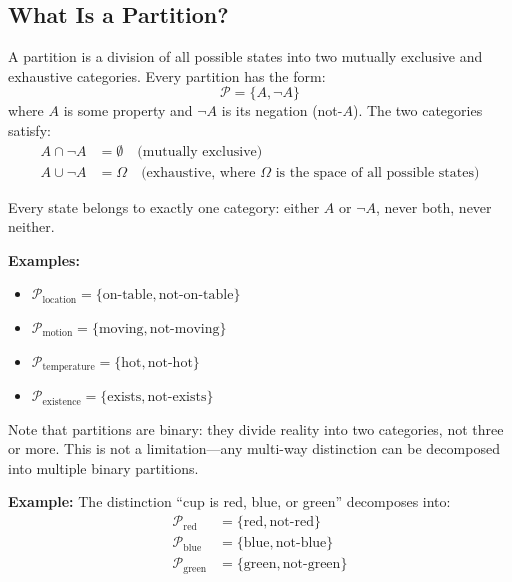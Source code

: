 \documentclass[twocolumn,10pt]{article}
\theoremstyle{definition}
\theoremstyle{remark}
\begin{document}
\subsection{What Is a Partition?}

A partition is a division of all possible states into two mutually exclusive and exhaustive categories. Every partition has the form:
\begin{equation}
\mathcal{P} = \{A, \neg A\}
\end{equation}
where $A$ is some property and $\neg A$ is its negation (not-$A$). The two categories satisfy:
\begin{align}
A \cap \neg A &= \emptyset \quad \text{(mutually exclusive)} \\
A \cup \neg A &= \Omega \quad \text{(exhaustive, where $\Omega$ is the space of all possible states)}
\end{align}

\noindent Every state belongs to exactly one category: either $A$ or $\neg A$, never both, never neither.

\vspace{0.2cm}
\noindent\textbf{Examples:}

\begin{itemize}
\item $\mathcal{P}_{\text{location}} = \{\text{on-table}, \text{not-on-table}\}$
\item $\mathcal{P}_{\text{motion}} = \{\text{moving}, \text{not-moving}\}$
\item $\mathcal{P}_{\text{temperature}} = \{\text{hot}, \text{not-hot}\}$
\item $\mathcal{P}_{\text{existence}} = \{\text{exists}, \text{not-exists}\}$
\end{itemize}

\noindent Note that partitions are binary: they divide reality into two categories, not three or more. This is not a limitation—any multi-way distinction can be decomposed into multiple binary partitions.

\vspace{0.2cm}
\noindent\textbf{Example:} The distinction ``cup is red, blue, or green'' decomposes into:
\begin{align}
\mathcal{P}_{\text{red}} &= \{\text{red}, \text{not-red}\} \\
\mathcal{P}_{\text{blue}} &= \{\text{blue}, \text{not-blue}\} \\
\mathcal{P}_{\text{green}} &= \{\text{green}, \text{not-green}\}
\end{align}
\end{document}
